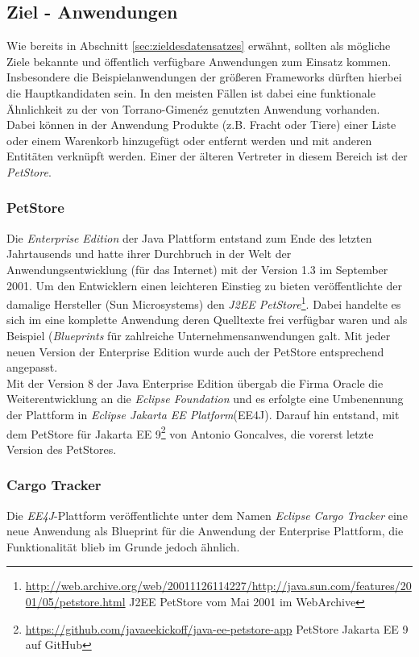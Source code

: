 \subsection{Ziel - Anwendungen}
\label{sec:targetapp}
Wie bereits in Abschnitt \ref{sec:zieldesdatensatzes} erwähnt, sollten als mögliche Ziele bekannte und öffentlich verfügbare Anwendungen zum Einsatz kommen. Insbesondere die Beispielanwendungen der größeren Frameworks dürften hierbei die Hauptkandidaten sein. In den meisten Fällen ist dabei eine funktionale Ähnlichkeit zu der von Torrano-Gimenéz genutzten Anwendung vorhanden. Dabei können in der Anwendung Produkte (z.B. Fracht oder Tiere) einer Liste oder einem Warenkorb hinzugefügt oder entfernt werden und mit anderen Entitäten verknüpft werden. Einer der älteren Vertreter in diesem Bereich ist der \emph{PetStore}.

\subsubsection{PetStore}

Die \emph{Enterprise Edition} der Java Plattform entstand zum Ende des letzten Jahrtausends und hatte ihrer Durchbruch in der Welt der Anwendungsentwicklung (für das Internet) mit der Version 1.3 im September 2001. Um den Entwicklern einen leichteren Einstieg zu bieten veröffentlichte der damalige Hersteller (Sun Microsystems) den \emph{J2EE PetStore}\footnote{\url{http://web.archive.org/web/20011126114227/http://java.sun.com/features/2001/05/petstore.html} J2EE PetStore vom Mai 2001 im WebArchive}. Dabei handelte es sich im eine komplette Anwendung deren Quelltexte frei verfügbar waren und als Beispiel (\emph{Blueprints} für zahlreiche Unternehmensanwendungen galt. Mit jeder neuen Version der Enterprise Edition wurde auch der PetStore entsprechend angepasst.\\

Mit der Version 8 der Java Enterprise Edition übergab die Firma Oracle die Weiterentwicklung an die \emph{Eclipse Foundation} und es erfolgte eine Umbenennung der Plattform in \glqq\emph{Eclipse Jakarta EE Platform}\grqq{}(EE4J). Darauf hin entstand, mit dem PetStore für Jakarta EE 9\footnote{\url{https://github.com/javaeekickoff/java-ee-petstore-app} PetStore Jakarta EE 9 auf GitHub} von Antonio Goncalves, die vorerst letzte Version des PetStores. 


\subsubsection{Cargo Tracker}
Die \emph{EE4J}-Plattform veröffentlichte unter dem Namen \glqq\emph{Eclipse Cargo Tracker}\grqq{} eine neue Anwendung als Blueprint für die Anwendung der Enterprise Plattform, die Funktionalität blieb im Grunde jedoch ähnlich.\\

